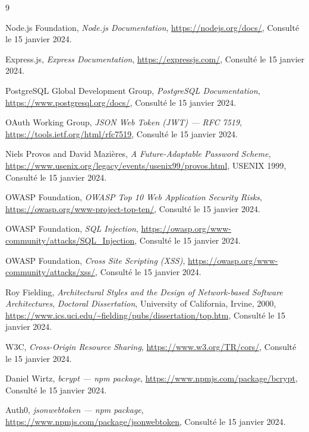 \begin{thebibliography}{9}

Node.js Foundation,
\textit{Node.js Documentation},
\url{https://nodejs.org/docs/},
Consulté le 15 janvier 2024.

Express.js,
\textit{Express Documentation},
\url{https://expressjs.com/},
Consulté le 15 janvier 2024.

PostgreSQL Global Development Group,
\textit{PostgreSQL Documentation},
\url{https://www.postgresql.org/docs/},
Consulté le 15 janvier 2024.

OAuth Working Group,
\textit{JSON Web Token (JWT) — RFC 7519},
\url{https://tools.ietf.org/html/rfc7519},
Consulté le 15 janvier 2024.

Niels Provos and David Mazières,
\textit{A Future-Adaptable Password Scheme},
\url{https://www.usenix.org/legacy/events/usenix99/provos.html},
USENIX 1999,
Consulté le 15 janvier 2024.

OWASP Foundation,
\textit{OWASP Top 10 Web Application Security Risks},
\url{https://owasp.org/www-project-top-ten/},
Consulté le 15 janvier 2024.

OWASP Foundation,
\textit{SQL Injection},
\url{https://owasp.org/www-community/attacks/SQL_Injection},
Consulté le 15 janvier 2024.

OWASP Foundation,
\textit{Cross Site Scripting (XSS)},
\url{https://owasp.org/www-community/attacks/xss/},
Consulté le 15 janvier 2024.

Roy Fielding,
\textit{Architectural Styles and the Design of Network-based Software Architectures},
\textit{Doctoral Dissertation}, University of California, Irvine, 2000,
\url{https://www.ics.uci.edu/~fielding/pubs/dissertation/top.htm},
Consulté le 15 janvier 2024.

W3C,
\textit{Cross-Origin Resource Sharing},
\url{https://www.w3.org/TR/cors/},
Consulté le 15 janvier 2024.

Daniel Wirtz,
\textit{bcrypt — npm package},
\url{https://www.npmjs.com/package/bcrypt},
Consulté le 15 janvier 2024.

Auth0,
\textit{jsonwebtoken — npm package},
\url{https://www.npmjs.com/package/jsonwebtoken},
Consulté le 15 janvier 2024.


\end{thebibliography}
